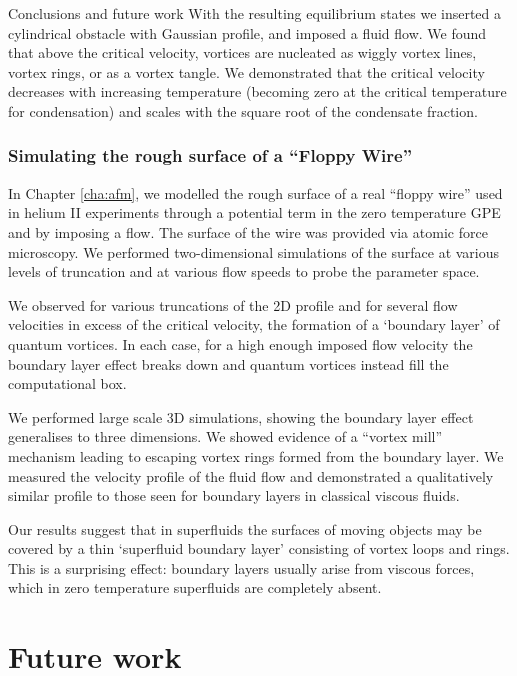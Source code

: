 \begin{chapter}{\label{cha:conc}Conclusions and future work}
With the resulting equilibrium states we inserted a cylindrical obstacle with Gaussian profile, and imposed a fluid flow.  We found that above the critical velocity, vortices are nucleated as wiggly vortex lines, vortex rings, or as a vortex tangle. We demonstrated that the critical velocity decreases with increasing temperature (becoming zero at the critical temperature for condensation) and scales with the square root of the condensate fraction.

\subsubsection{Simulating the rough surface of a ``Floppy Wire''}
In Chapter \ref{cha:afm}, we modelled the rough surface of a real ``floppy wire'' used in helium II experiments through a potential term in the zero temperature GPE and by imposing a flow. The surface of the wire was provided via atomic force microscopy. We performed two-dimensional simulations of the surface at various levels of truncation and at various flow speeds to probe the parameter space.

We observed for various truncations of the 2D profile and for several flow velocities in excess of the critical velocity, the formation of a `boundary layer' of quantum vortices. In each case, for a high enough imposed flow velocity the boundary layer effect breaks down and quantum vortices instead fill the computational box.

We performed large scale 3D simulations, showing the boundary layer effect generalises to three dimensions. We showed evidence of a ``vortex mill'' mechanism leading to escaping vortex rings formed from the boundary layer. We measured the velocity profile of the fluid flow and demonstrated a qualitatively similar profile to those seen for boundary layers in classical viscous fluids.

Our results suggest that in superfluids the surfaces of moving objects may be covered by a thin `superfluid boundary layer' consisting of vortex loops and rings. This is a surprising effect: boundary layers usually arise from viscous forces, which in zero temperature superfluids are completely absent.

\section{Future work} 

\end{chapter}
